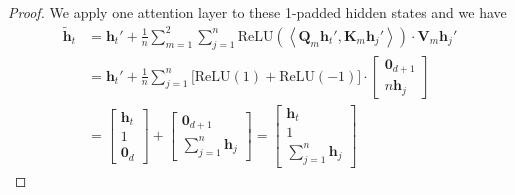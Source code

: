 \documentclass[11pt]{article}
\theoremstyle{plain}
\theoremstyle{definition}
\theoremstyle{remark}
\newcommand{\zero}{\boldsymbol{0}}
\renewcommand{\^}[1]{^{(#1)}}
\newcommand{\bh}{\boldsymbol{h}}
\newcommand{\bK}{\boldsymbol{K}}
\newcommand{\bQ}{\boldsymbol{Q}}
\newcommand{\bV}{\boldsymbol{V}}
\newcommand{\inner}[1]{ \left\langle {#1} \right\rangle }
\begin{document}
\begin{proof}
We apply one attention layer to these 1-padded hidden states and we have 
\begin{equation}
\begin{aligned}
    \tilde{\bh}_t  & = \bh_t' + \frac{1}{n} \sum_{m=1}^2 \sum_{j=1}^n \mathrm{ReLU} \left(\inner{\bQ_m \bh_t', \bK_m \bh_j'}\right) \cdot \bV_m \bh_j' \\
    &= \bh_t' +  \frac{1}{n} \sum_{j=1}^n \Big[\mathrm{ReLU}(1) + \mathrm{ReLU}(-1)\Big] \cdot \begin{bmatrix}
    \zero_{d+1} \\ n \bh_j 
\end{bmatrix} \\
    &= \begin{bmatrix}
        \bh_t \\ 1 \\ \zero_d
    \end{bmatrix} + 
    \begin{bmatrix}
    \zero_{d+1} \\  \sum_{j=1}^n \bh_j 
\end{bmatrix} = \begin{bmatrix}
        \bh_t \\ 1 \\ \sum_{j=1}^n \bh_j
    \end{bmatrix}
\end{aligned}
\end{equation}  
\end{proof}
\end{document}
